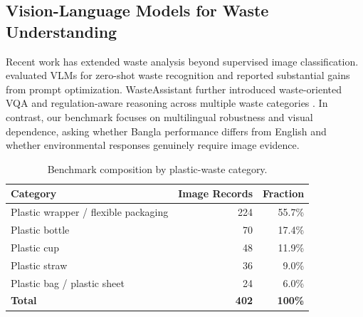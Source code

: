 \documentclass{article}
\begin{document}
\subsection{Vision-Language Models for Waste Understanding}

Recent work has extended waste analysis beyond supervised image classification. \citet{malla2025wasterecognition} evaluated VLMs for zero-shot waste recognition and reported substantial gains from prompt optimization. WasteAssistant further introduced waste-oriented VQA and regulation-aware reasoning across multiple waste categories \citep{kataruka2026wasteassistant}. In contrast, our benchmark focuses on multilingual robustness and visual dependence, asking whether Bangla performance differs from English and whether environmental responses genuinely require image evidence.
\begin{table}[t] \centering \caption{Benchmark composition by plastic-waste category.} \label{tab:benchmark_composition} \begin{tabular}{lrr} \toprule \textbf{Category} & \textbf{Image Records} & \textbf{Fraction} \\ \midrule Plastic wrapper / flexible packaging & 224 & 55.7\% \\ Plastic bottle & 70 & 17.4\% \\ Plastic cup & 48 & 11.9\% \\ Plastic straw & 36 & 9.0\% \\ Plastic bag / plastic sheet & 24 & 6.0\% \\ \midrule \textbf{Total} & \textbf{402} & \textbf{100\%} \\ \bottomrule \end{tabular} \end{table}
\end{document}
